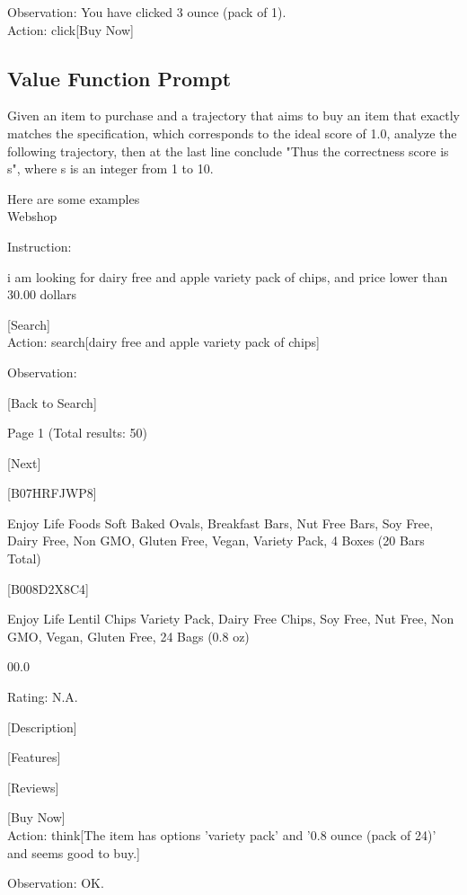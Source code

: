 \documentclass{article} \usepackage{iclr2024_conference,times}
\def\1{\bm{1}}
\begin{document}
Observation: You have clicked 3 ounce (pack of 1). 
\\

Action: click[Buy Now]

\subsection{Value Function Prompt}

Given an item to purchase and a trajectory that aims to buy an item that exactly matches the specification, which corresponds to the ideal score of 1.0, analyze the following trajectory, then at the last line conclude "Thus the correctness score is {s}", where s is an integer from 1 to 10.

Here are some examples
\\

Webshop

Instruction:

i am looking for dairy free and apple variety pack of chips, and price lower than 30.00 dollars

[Search]
\\

Action: search[dairy free and apple variety pack of chips]

Observation:

[Back to Search]

Page 1 (Total results: 50)

[Next]

[B07HRFJWP8]

Enjoy Life Foods Soft Baked Ovals, Breakfast Bars, Nut Free Bars, Soy Free, Dairy Free, Non GMO, Gluten Free, Vegan, Variety Pack, 4 Boxes (20 Bars Total)


[B008D2X8C4]

Enjoy Life Lentil Chips Variety Pack, Dairy Free Chips, Soy Free, Nut Free, Non GMO, Vegan, Gluten Free, 24 Bags (0.8 oz)

\100.0

Rating: N.A.

[Description]

[Features]

[Reviews]

[Buy Now]
\\

Action: think[The item has options 'variety pack' and '0.8 ounce (pack of 24)' and seems good to buy.]

Observation: OK.
\\
\end{document}
